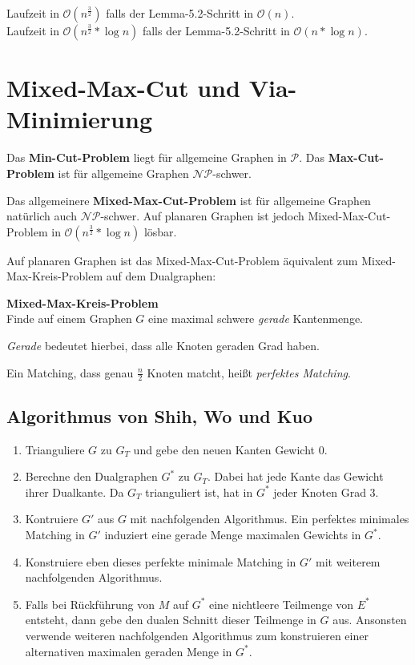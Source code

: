 \documentclass[10pt,a4paper]{article}
\begin{document}
Laufzeit in $\mathcal{O}(n^\frac{3}{2})$ falls der Lemma-5.2-Schritt in
$\mathcal{O}(n)$.\\
Laufzeit in $\mathcal{O}(n^\frac{3}{2} * \log n)$ falls der Lemma-5.2-Schritt
in $\mathcal{O}(n * \log n)$.


\clearpage
\section{Mixed-Max-Cut und Via-Minimierung}
Das \textbf{Min-Cut-Problem} liegt für allgemeine Graphen in $\mathcal{P}$.
Das \textbf{Max-Cut-Problem} ist für allgemeine Graphen $\mathcal{NP}$-schwer.

Das allgemeinere \textbf{Mixed-Max-Cut-Problem} ist für allgemeine Graphen
natürlich auch $\mathcal{NP}$-schwer.
Auf planaren Graphen ist jedoch Mixed-Max-Cut-Problem in
$\mathcal{O}(n^\frac{3}{2} * \log n)$ lösbar.

Auf planaren Graphen ist das Mixed-Max-Cut-Problem äquivalent zum
Mixed-Max-Kreis-Problem auf dem Dualgraphen:

\textbf{Mixed-Max-Kreis-Problem}\\
Finde auf einem Graphen $G$ eine maximal schwere \textit{gerade} Kantenmenge.

\textit{Gerade} bedeutet hierbei, dass alle Knoten geraden Grad haben.

Ein Matching, dass genau $\frac{n}{2}$ Knoten matcht, heißt \textit{perfektes
Matching}.

\subsection{Algorithmus von Shih, Wo und Kuo}
\begin{enumerate}
    \item Trianguliere $G$ zu $G_T$ und gebe den neuen Kanten Gewicht 0.
    \item Berechne den Dualgraphen $G^*$ zu $G_T$.
        Dabei hat jede Kante das Gewicht ihrer Dualkante.
        Da $G_T$ trianguliert ist, hat in $G^*$ jeder Knoten Grad 3.
    \item Kontruiere $G'$ aus $G$ mit nachfolgenden Algorithmus.
        Ein perfektes minimales Matching in $G'$ induziert eine gerade Menge
        maximalen Gewichts in $G^*$.
    \item Konstruiere eben dieses perfekte minimale Matching in $G'$ mit
        weiterem nachfolgenden Algorithmus.
    \item Falls bei Rückführung von $M$ auf $G^*$ eine nichtleere Teilmenge von
        $E^*$ entsteht, dann gebe den dualen Schnitt dieser Teilmenge in $G$
        aus.
        Ansonsten verwende weiteren nachfolgenden Algorithmus zum konstruieren
        einer alternativen maximalen geraden Menge in $G^*$.
\end{enumerate}
\end{document}
